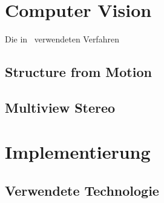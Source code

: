 	\section{Computer Vision}
		Die in \dronarch\ verwendeten Verfahren 
		\subsection{Structure from Motion} \label{sfm}
		
		\subsection{Multiview Stereo} \label{mvs}
	
	\section{Implementierung}
		\subsection{Verwendete Technologie} \label{imp:tech}		
